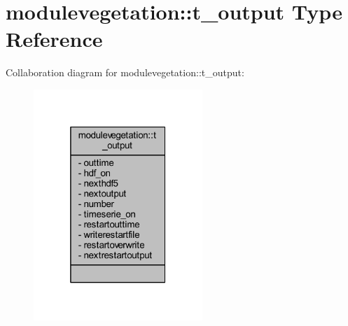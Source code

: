 \hypertarget{structmodulevegetation_1_1t__output}{}\section{modulevegetation\+:\+:t\+\_\+output Type Reference}
\label{structmodulevegetation_1_1t__output}


Collaboration diagram for modulevegetation\+:\+:t\+\_\+output\+:\nopagebreak
\begin{figure}[H]
\begin{center}
\leavevmode
\includegraphics[width=181pt]{structmodulevegetation_1_1t__output__coll__graph}
\end{center}
\end{figure}
